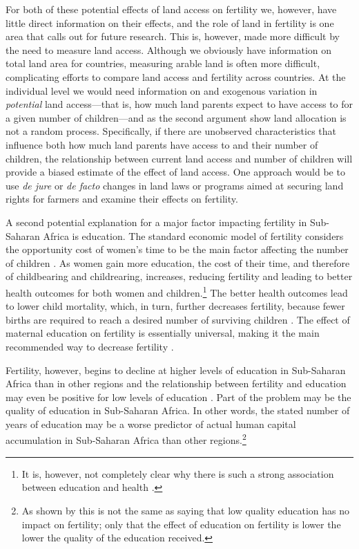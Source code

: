 For both of these potential effects of land access on fertility we, however, have little direct information on their effects, and the role of land in fertility is one area that calls out for future research. This is, however, made more difficult by the need to measure land access. Although we obviously have information on total land area for countries, measuring arable land is often more difficult, complicating efforts to compare land access and fertility across countries. At the individual level we would need information on and exogenous variation in \emph{potential} land access---that is, how much land parents expect to have access to for a given number of children---and as the second argument show land allocation is not a random process. Specifically, if there are unobserved characteristics that influence both how much land parents have access to and their number of children, the relationship between current land access and number of children will provide a biased estimate of the effect of land access. One approach would be to use \emph{de jure} or \emph{de facto} changes in land laws or programs aimed at securing land rights for farmers and examine their effects on fertility.

A second potential explanation for a major factor impacting fertility in Sub-Saharan Africa is education. The standard economic model of fertility considers the opportunity cost of women's time to be the main factor affecting the number of children \citep{becker91}. As women gain more education, the cost of their time, and therefore of childbearing and childrearing, increases, reducing fertility and leading to better health outcomes for both women and children.\footnote{It is, however, not completely clear why there is such a strong association between education and health \citep{Thomas1991,Glewwe1999,Kovsted2002}.} The better health outcomes lead to lower child mortality, which, in turn, further decreases fertility, because fewer births are required to reach a desired number of surviving children \citep{Ainsworth1996}. The effect of maternal education on fertility is essentially universal, making it the main recommended way to decrease fertility \citep{schultz02}.

Fertility, however, begins to decline at higher levels of education in Sub-Saharan Africa than in other regions and the relationship between fertility and education may even be positive for low levels of education \citep{Ainsworth1996,Benefo1996,Thomas1996}. Part of the problem may be the quality of education in Sub-Saharan Africa. In other words, the stated number of years of education may be a worse predictor of actual human capital accumulation in Sub-Saharan Africa than other regions.\footnote{As shown by \citet{Oye2016} this is not the same as saying that low quality education has no impact on fertility; only that the effect of education on fertility is lower the lower the quality of the education received.}

